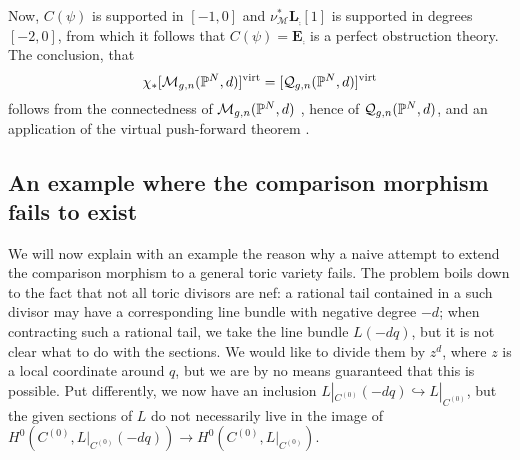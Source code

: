 \begin{center}
\end{center}

Now, $C(\psi)$ is supported in $[-1,0]$ \cite[Lemma 4.20]{Manolache-Push} and $\nu_{\mathcal M}^*\mathbf L_{\tilde{\comp}}{[1]}$ is supported in degrees $[-2,0]$, from which it follows that $C(\psi)=\mathbf E_{\comp}$ is a perfect obstruction theory. The conclusion, that
\begin{equation*} \chi_*[\mathcal{M}_{g,n}(\mathbb P^N,d)]^{\operatorname{virt}}=[\mathcal{Q}_{g,n}(\mathbb P^N,d)]^{\operatorname{virt}} \end{equation*}
follows from the connectedness of $\mathcal{M}_{g,n}(\mathbb P^N,d)$ \cite{KP}, hence of $\mathcal{Q}_{g,n}(\mathbb P^N,d)$, and an application of the virtual push-forward theorem \cite[Proposition 4.21]{Manolache-Push}.

\subsection{An example where the comparison morphism fails to exist}
We will now explain with an example the reason why a naive attempt to extend the comparison morphism to a general toric variety fails. The problem boils down to the fact that not all toric divisors are nef: a rational tail contained in a such divisor may have a corresponding line bundle with negative degree $-d$; when contracting such a rational tail, we take the line bundle $L(-dq)$, but it is not clear what to do with the sections. We would like to divide them by $z^d$, where $z$ is a local coordinate around $q$, but we are by no means guaranteed that this is possible. Put differently, we now have an inclusion $L|_{C^{(0)}}(-dq)\hookrightarrow L|_{C^{(0)}}$, but the given sections of $L$ do not necessarily live in the image of $H^0(C^{(0)},L|_{C^{(0)}}(-dq))\to H^0(C^{(0)},L|_{C^{(0)}})$.

